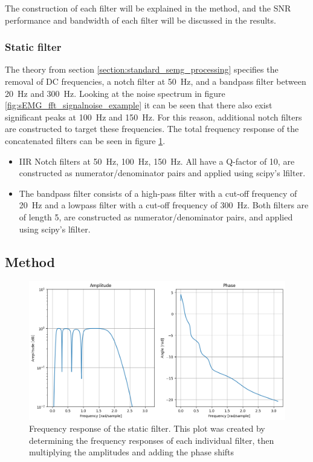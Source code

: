 The construction of each filter will be explained in the method, and the SNR performance and bandwidth of each filter will be discussed in the results. 

\subsubsection{Static filter}
The theory from section \ref{section:standard_semg_processing} specifies the removal of DC frequencies, a notch filter at \SI{50}{Hz}, and a bandpass filter between \SI{20}{Hz} and \SI{300}{Hz}. Looking at the noise spectrum in figure \ref{fig:sEMG_fft_signalnoise_example} it can be seen that there also exist significant peaks at \SI{100}{Hz} and \SI{150}{Hz}. For this reason, additional notch filters are constructed to target these frequencies. The total frequency response of the concatenated filters can be seen in figure \ref{fig:staticfilter_frequencyresponse}.
\begin{itemize}
    \item IIR Notch filters at \SI{50}{Hz}, \SI{100}{Hz}, \SI{150}{Hz}. All have a Q-factor of 10, are constructed as numerator/denominator pairs and applied using scipy's lfilter.
    \item The bandpass filter consists of a high-pass filter with a cut-off frequency of \SI{20}{Hz} and a lowpass filter with a cut-off frequency of \SI{300}{Hz}. Both filters are of length 5, are constructed as numerator/denominator pairs, and applied using scipy's lfilter.
\end{itemize}

\subsection{Method}
\begin{figure}[h!t]
	\begin{center}
		\includegraphics[width=1.0\columnwidth]{images/staticfilter_frequencyresponse.png}
	\end{center}
	\caption{Frequency response of the static filter. This plot was created by determining the frequency responses of each individual filter, then multiplying the amplitudes and adding the phase shifts}
	\label{fig:staticfilter_frequencyresponse}
\end{figure}


